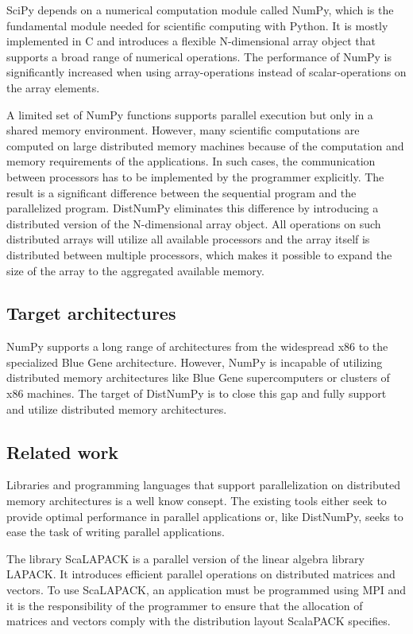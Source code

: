 \documentclass[10pt]{article}
\begin{document}
SciPy depends on a numerical computation module called NumPy\cite{numpy}, which is the fundamental module needed for scientific computing with Python. It is mostly implemented in C and introduces a flexible N-dimensional array object that supports a broad range of numerical operations. The performance of NumPy is significantly increased when using array-operations instead of scalar-operations on the array elements.

A limited set of NumPy functions supports parallel execution but only in a shared memory environment. However, many scientific computations are computed on large distributed memory machines because of the computation and memory requirements of the applications. In such cases, the communication between processors has to be implemented by the programmer explicitly. The result is a significant difference between the sequential program and the parallelized program. DistNumPy eliminates this difference by introducing a distributed version of the N-dimensional array object. All operations on such distributed arrays will utilize all available processors and the array itself is distributed between multiple processors, which makes it possible to expand the size of the array to the aggregated available memory.


\subsection{Target architectures}
NumPy supports a long range of architectures from the widespread x86 to the specialized Blue Gene architecture. However, NumPy is incapable of utilizing distributed memory architectures like Blue Gene supercomputers or clusters of x86 machines. The target of DistNumPy is to close this gap and fully support and utilize distributed memory architectures. 


\subsection{Related work}
Libraries and programming languages that support parallelization on distributed memory architectures is a well know consept. The existing tools either seek to provide optimal performance in parallel applications or, like DistNumPy, seeks to ease the task of writing parallel applications.

The library ScaLAPACK\cite{Blackford96} is a parallel version of the linear algebra library LAPACK\cite{lapack90}. It introduces efficient parallel operations on distributed matrices and vectors. To use ScaLAPACK, an application must be programmed using MPI\cite{mpi} and it is the responsibility of the programmer to ensure that the allocation of matrices and vectors comply with the distribution layout ScalaPACK specifies.
\end{document}

